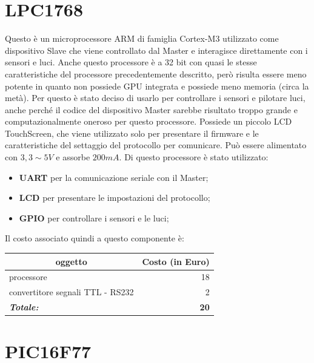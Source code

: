 \documentclass[a4paper,titlepage]{book}
\begin{document}
\section{LPC1768}



Questo è un microprocessore ARM di famiglia Cortex-M3 utilizzato come dispositivo Slave che viene controllato dal Master e interagisce direttamente con i sensori e luci. Anche questo processore è a 32 bit con quasi le stesse caratteristiche del processore precedentemente descritto, però risulta essere meno potente in quanto non possiede GPU integrata e possiede meno memoria (circa la metà). Per questo è stato deciso di usarlo per controllare i sensori e pilotare luci, anche perché il codice del dispositivo Master sarebbe risultato troppo grande e computazionalmente oneroso per questo processore. Possiede un piccolo LCD TouchScreen, che viene utilizzato solo per presentare il firmware e le caratteristiche del settaggio del protocollo per comunicare. Può essere alimentato con $3,3 \sim 5 V$ e assorbe $200 mA$. Di questo processore è stato utilizzato:

\begin{itemize}[noitemsep,topsep=10pt,parsep=23pt,partopsep=0pt]
\item \textbf{UART} per la comunicazione seriale con il Master;
\item \textbf{LCD} per presentare le impostazioni del protocollo;
\item \textbf{GPIO} per controllare i sensori e le luci;
\end{itemize}

Il costo associato quindi a questo componente è:

\begin{tabular}{|l  r|}
\hline
\multicolumn{1}{|c|}{\textbf {oggetto}} & \multicolumn{1}{c|}{\textbf {Costo (in Euro)}} \\
\hline

processore 				& 18 \\
convertitore segnali TTL - RS232 	&  2  \\
\hline
\hline

\textit{\textbf{Totale:}}		& \textbf{20} \\

\hline
\end{tabular}

\section{PIC16F77}
\end{document}
